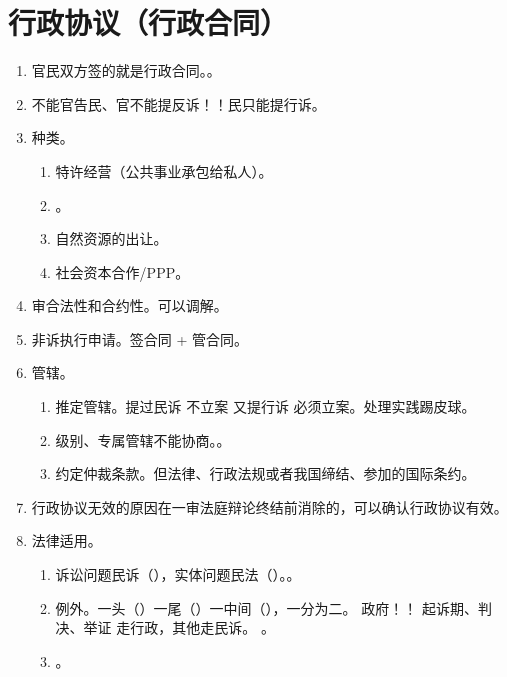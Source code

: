 \section{行政协议（行政合同）}
\begin{enumerate}
  \item 官民双方签的就是行政合同。。
  \item 不能官告民、官不能提反诉！！民只能提行诉。
  \item 种类。
        \begin{enumerate}
          \item 特许经营（公共事业承包给私人）。
          \item {}。
          \item 自然资源的出让。
          \item 社会资本合作/PPP。
        \end{enumerate}
  \item 审合法性和合约性。可以调解。
  \item 非诉执行申请。签合同 + 管合同。
  \item 管辖。
        \begin{enumerate}
          \item 推定管辖。提过民诉 \yjt 不立案 \yjt 又提行诉 \yjt 必须立案。处理实践踢皮球。
          \item 级别、专属管辖不能协商。。
          \item 约定仲裁条款。但法律、行政法规或者我国缔结、参加的国际条约。
        \end{enumerate}
  \item 行政协议无效的原因在一审法庭辩论终结前消除的，可以确认行政协议有效。
  \item 法律适用。
        \begin{enumerate}
          \item 诉讼问题民诉（），实体问题民法（）。。
          \item 例外。一头（）一尾（）一中间（），一分为二。
                政府！！ \yjt 起诉期、判决、举证 \yjt 走行政，其他走民诉。
                。
          \item {}。
                \begin{enumerate}

\end{enumerate}
\end{enumerate}
\end{enumerate}
